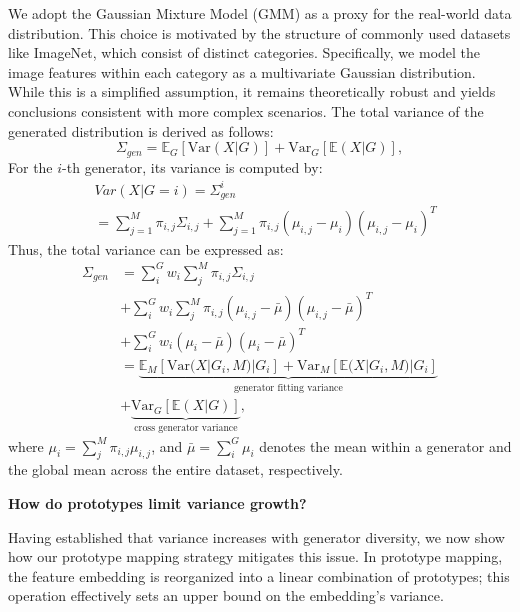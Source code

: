 We adopt the Gaussian Mixture Model (GMM) as a proxy for the real-world data distribution. This choice is motivated by the structure of commonly used datasets like ImageNet, which consist of distinct categories. Specifically, we model the image features within each category as a multivariate Gaussian distribution. While this is a simplified assumption, it remains theoretically robust and yields conclusions consistent with more complex scenarios. The total variance of the generated distribution is derived as follows:
\begin{equation}
    \Sigma_{gen}  = \mathbb{E}_G \left[ \text{Var}(X |G) \right] + \text{Var} _G\left[ \mathbb{E}(X|G)\right],
\end{equation}
For the $i$-th generator, its variance is computed by:
\begin{equation}
\begin{split}
    & Var(X|G=i)=\Sigma_{gen}^i \\
    & = \sum_{j=1}^{M}\pi_{i,j}\Sigma_{i,j} + \sum_{j=1}^{M}\pi_{i,j}(\mu_{i,j}-\mu_i)(\mu_{i,j}-\mu_i)^T
\end{split}
\end{equation}
Thus, the total variance can be expressed as:
\begin{equation}
\begin{split}
    \Sigma_{gen}&=\sum_{i}^{G}w_i\sum_{j}^{M}\pi_{i,j}\Sigma_{i,j} \\
     & + \sum_{i}^{G}w_i\sum_{j}^{M}\pi_{i,j}(\mu_{i,j}-\bar{\mu})(\mu_{i,j}-\bar{\mu})^T \\
     & + \sum_{i}^{G}w_i(\mu_{i}-\bar{\mu})(\mu_{i}-\bar{\mu})^T \\
     & = \underbrace{\mathbb{E}_M \left[ \text{Var}(X|G_i,M)|G_i\right]+\text{Var}_M\left[\mathbb{E}(X|G_i,M)|G_i \right]}_{\text{generator fitting variance}} \\
        & + \underbrace{\text{Var}_G \left[ \mathbb{E}(X|G)\right]}_{\text{cross generator variance}},
\end{split}
\end{equation}
where $\mu_i=\sum_{j}^{M}\pi_{i,j}\mu_{i,j}$, and $\bar{\mu}=\sum_{i}^{G}\mu_i$ denotes the mean within a generator and the global mean across the entire dataset, respectively.

\textbf{How do prototypes limit variance growth?}

Having established that variance increases with generator diversity, we now show how our prototype mapping strategy mitigates this issue. In prototype mapping, the feature embedding is reorganized into a linear combination of prototypes; this operation effectively sets an upper bound on the embedding's variance.

